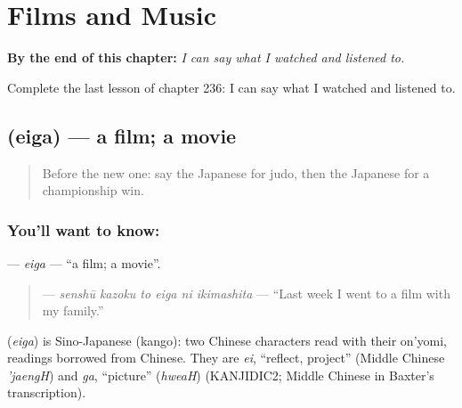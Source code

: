 
\chapter{Films and Music}
\label{ch:ja-films-and-music}

\begin{chapteropening}
\textbf{By the end of this chapter:} \emph{I can say what I watched and listened to.}

Complete the last lesson of chapter 236: I can say what I watched and listened to.
\end{chapteropening}

\section[\texorpdfstring{\ja{えいが} (eiga)}{えいが (eiga)}]{ (eiga) — a film; a movie}

\label{lesson:JA-C236-eiga}



\begin{quote}
Before the new one: say the Japanese for judo, then the Japanese for a championship win.
\end{quote}

\subsection*{You'll want to know: }
\textbf{} — \emph{eiga} — \textquotedblleft{}a film; a movie\textquotedblright{}.

\begin{quote}
\textbf{   } — \emph{senshū kazoku to eiga ni ikimashita} — \textquotedblleft{}Last week I went to a film with my family.\textquotedblright{}
\end{quote}

\begin{cousinweb}
\textbf{} (\emph{eiga}) is Sino-Japanese (kango): two Chinese characters read with their on'yomi, readings borrowed from Chinese. They are \emph{ei}, \textquotedblleft{}reflect, project\textquotedblright{} (Middle Chinese \emph{'jaengH}) and \emph{ga}, \textquotedblleft{}picture\textquotedblright{} (\emph{hweaH}) (KANJIDIC2; Middle Chinese in Baxter's transcription).
\end{cousinweb}

